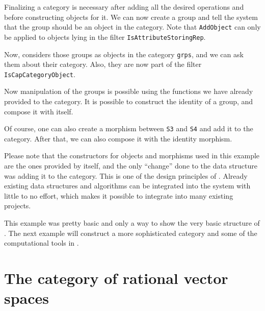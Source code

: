 

Finalizing a category is necessary after adding all the desired operations and before constructing objects
for it. We can now create a group and tell the system that the group should be an object in the category.
Note that \texttt{AddObject} can only be applied to \GAP objects lying in the filter
\texttt{IsAttributeStoringRep}.



Now, \CapPkg considers those groups as objects in the category \texttt{grps}, and we can
ask them about their category. Also, they are now part of the \GAP filter \texttt{IsCapCategoryObject}.



Now manipulation of the groups is possible using the functions we have already provided to the category.
It is possible to construct the identity of a group, and compose it with itself.



Of course, one can also create a morphism between \texttt{S3} and \texttt{S4} and add it to the category.
After that, we can also compose it with the identity morphism.



Please note that the constructors for objects and morphisms used in this example are the ones provided
by \GAP itself, and the only ``change'' done to the data structure was adding it to the category.
This is one of the design principles of \CapPkg. Already existing data structures and algorithms
can be integrated into the system with little to no effort, which makes it possible to integrate \CapPkg
into many existing projects.

This example was pretty basic and only a way to show the very basic structure of \CapPkg. The next example
will construct a more sophisticated category and some of the computational tools in \CapPkg.


\section{The category of rational vector spaces}

